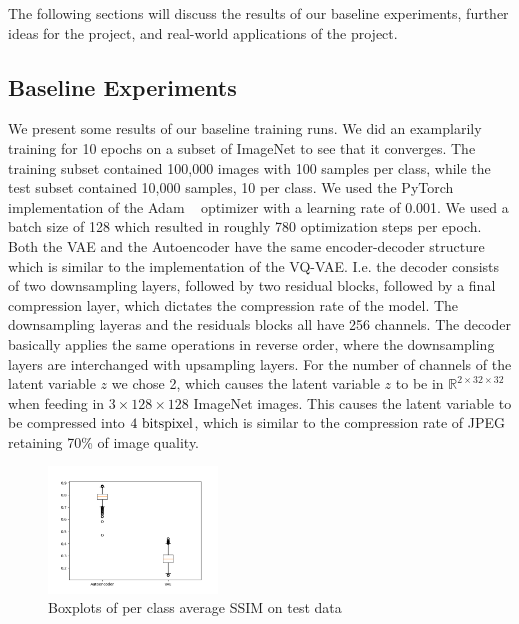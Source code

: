 The following sections will discuss the results of our baseline experiments, further ideas for the project, and real-world applications of the project.

\subsection{Baseline Experiments}\label{subsec:baseline-results}
    We present some results of our baseline training runs.
    We did an examplarily training for 10 epochs on a subset of ImageNet to see that it converges.
    The training subset contained 100,000 images with 100 samples per class, while the test subset contained 10,000 samples, 10 per class.
    We used the PyTorch implementation of the Adam ~\cite{citationNeeded} optimizer with a learning rate of 0.001.
    We used a batch size of 128 which resulted in roughly 780 optimization steps per epoch.
    Both the VAE and the Autoencoder have the same encoder-decoder structure which is similar to the implementation of the VQ-VAE.
    I.e. the decoder consists of two downsampling layers, followed by two residual blocks, followed by a final compression layer, which dictates the compression rate of the model.
    The downsampling layeras and the residuals blocks all have 256 channels.
    The decoder basically applies the same operations in reverse order, where the downsampling layers are interchanged with upsampling layers.
    For the number of channels of the latent variable $z$ we chose 2, which causes the latent variable $z$ to be in $\mathbb{R}^{2\times 32 \times 32}$ when feeding in $3 \times 128 \times 128$ ImageNet images.
    This causes the latent variable to be compressed into $4\text{ bits}\/\text{pixel}$, which is similar to the compression rate of JPEG retaining 70\% of image quality.

    \begin{figure}
        \centering
        \includegraphics[width=0.4\textwidth]{../../sample_images/evaluation/boxplot_ae_and_vae.png}
        \caption{Boxplots of per class average SSIM on test data}
        \label{fig:boxplots}
    \end{figure}

